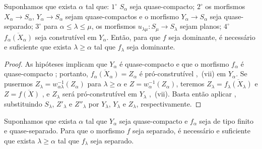 \begin{proposition}[8.10.3]
\label{IV.8.10.3}
Suponhamos que exista $\alpha$ tal que: $1^\circ$ $S_\alpha$ seja quase-compacto; $2^\circ$ os morfismos $X_\alpha\to S_\alpha$, $Y_\alpha\to S_\alpha$ sejam quase-compactos e o morfismo $Y_\alpha\to S_\alpha$ seja quase-separado; $3^\circ$ para $\alpha\leqslant\lambda\leqslant\mu$, os morfismos $u_{\lambda\mu}:S_\mu\to S_\lambda$ sejam planos; $4^\circ$ $\overline{f_\alpha(X_\alpha)}$ seja construtível em $Y_\alpha$.
Então, para que $f$ seja dominante, é necessário e suficiente que exista $\lambda\geqslant\alpha$ tal que $f_\lambda$ seja dominante.
\end{proposition}

\begin{proof}
As hipóteses implicam que $Y_\alpha$ é quase-compacto e que o morfismo $f_\alpha$ é quase-compacto ; portanto, $\overline{f_\alpha(X_\alpha)}=Z_\alpha$ é pró-construtível ,~(vii) em $Y_\alpha$.
Se pusermos $Z_\lambda=w_{\alpha\lambda}^{-1}(Z_\alpha)$ para $\lambda\geqslant\alpha$ e $Z=w_\alpha^{-1}(Z_\alpha)$, teremos $Z_\lambda=\overline{f_\lambda(X_\lambda)}$ e $Z=\overline{f(X)}$ , e $Z_\lambda$ será pró-construtível em $Y_\lambda$ ,~(vii).
Basta então aplicar , substituindo $S_\lambda$, $Z'_\lambda$ e $Z''_\lambda$ por $Y_\lambda$, $Y_\lambda$ e $Z_\lambda$, respectivamente.
\end{proof}

\begin{proposition}[8.10.4]
\label{IV.8.10.4}
Suponhamos que exista $\alpha$ tal que $Y_\alpha$ seja quase-compacto e $f_\alpha$ seja de tipo finito e quase-separado.
Para que o morfismo $f$ seja separado, é necessário e suficiente que exista $\lambda\geqslant\alpha$ tal que $f_\lambda$ seja separado.
\end{proposition}

